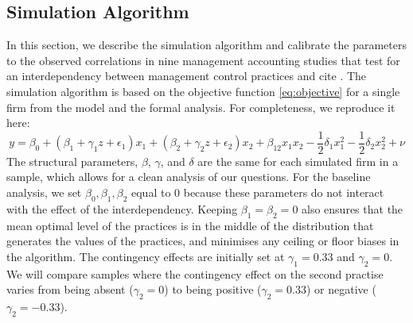 \documentclass[12pt]{article}
\begin{document}
\subsection{Simulation Algorithm}

In this section, we describe the simulation algorithm and calibrate the parameters to the observed correlations in nine management accounting studies that test for an interdependency between management control practices and cite \citet{grabner_management_2013}. The simulation algorithm is based on the objective function \eqref{eq:objective} for a single firm from the model and the formal analysis. For completeness, we reproduce it here:
\begin{equation*}
y  = \beta_0 + (\beta_{1} + \gamma_1 z + \epsilon_1) x_1 
						+ (\beta_{2} + \gamma_2 z  + \epsilon_2) x_2 
                        + \beta_{12} x_1 x_2 - \frac{1}{2}\delta_1 x^2_1 - \frac{1}{2}\delta_2 x^2_2 + \nu
\end{equation*}
The structural parameters, $\beta$, $\gamma$, and $\delta$ are the same for each simulated firm in a sample, which allows for a clean analysis of our questions. For the baseline analysis, we set $\beta_0, \beta_{1}, \beta_{2}$ equal to $0$ because these parameters do not interact with the effect of the interdependency. Keeping $\beta_{1} = \beta_{2} = 0$ also ensures that the mean optimal level of the practices is in the middle of the distribution that generates the values of the practices, and minimises any ceiling or floor biases in the algorithm. The contingency effects are initially set at $\gamma_1 = 0.33$ and $\gamma_2 = 0$. We will compare samples where the contingency effect on the second practise varies from being absent ($\gamma_2 = 0$) to being positive ($\gamma_2 = 0.33$) or negative ($\gamma_2 = -0.33$).  
\end{document}
